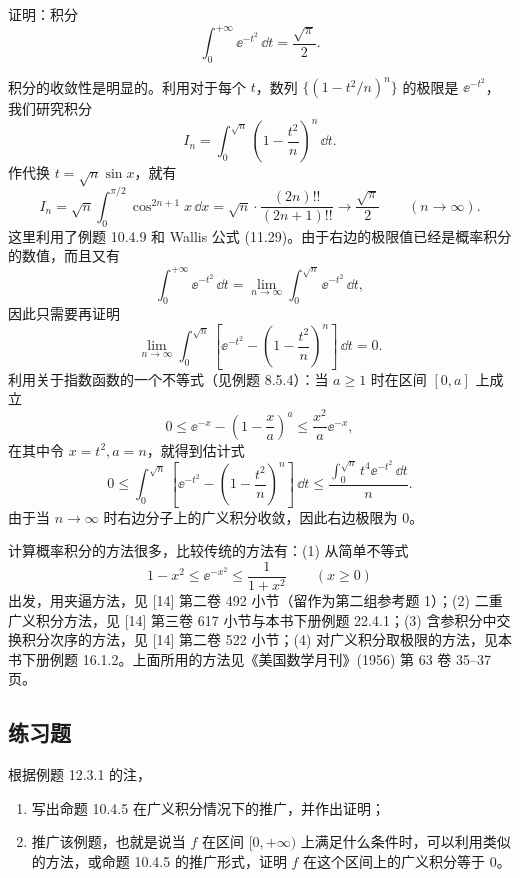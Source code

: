\begin{xexample}
证明：积分
\[
  \int_0^{+\infty}\ee^{-t^2}\,\dd t=\frac{\sqrt\pi}{2}.
\]
\end{xexample}
\begin{xsolution}
积分的收敛性是明显的。利用对于每个 $t$，数列 $\{(1-t^2/n)^n\}$ 的极限是 $\ee^{-t^2}$，我们研究积分
\[
  I_n=\int_0^{\sqrt n}\left(1-\frac{t^2}n\right)^n\,\dd t.
\]
作代换 $t=\sqrt n\sin x$，就有
\[
  I_n=\sqrt n\int_0^{\pi/2}\cos^{2n+1}x\,\dd x
  =\sqrt n\cdot\frac{(2n)!!}{(2n+1)!!}\to\frac{\sqrt\pi}{2}\qquad(n\to\infty).
\]
这里利用了例题 10.4.9 和 Wallis 公式 (11.29)。由于右边的极限值已经是概率积分的数值，而且又有
\[
  \int_0^{+\infty}\ee^{-t^2}\,\dd t
  =\lim_{n\to\infty}\int_0^{\sqrt n}\ee^{-t^2}\,\dd t,
\]
因此只需要再证明
\[
  \lim_{n\to\infty}\int_0^{\sqrt n}\left[\ee^{-t^2}-\left(1-\frac{t^2}n\right)^n\right]\,\dd t=0.
\]
利用关于指数函数的一个不等式（见例题 8.5.4）：当 $a\geq1$ 时在区间 $[0,a]$ 上成立
\begin{equation}
  0\leq\ee^{-x}-\left(1-\frac xa\right)^a\leq\frac{x^2}{a}\ee^{-x},
  \tag{12.7}
  \label{eq:12.7}
\end{equation}
在其中令 $x=t^2,a=n$，就得到估计式
\[
  0\leq\int_0^{\sqrt n}\left[\ee^{-t^2}-\left(1-\frac{t^2}n\right)^n\right]\,\dd t
  \leq\frac{\int_0^{\sqrt n}t^4\ee^{-t^2}\,\dd t}{n}.
\]
由于当 $n\to\infty$ 时右边分子上的广义积分收敛，因此右边极限为 0。
\end{xsolution}

\begin{xremark}
计算概率积分的方法很多，比较传统的方法有：(1) 从简单不等式
\begin{equation}
  1-x^2\leq\ee^{-x^2}\leq\frac1{1+x^2}\qquad(x\geq0)
  \tag{12.8}
  \label{eq:12.8}
\end{equation}
出发，用夹逼方法，见 [14] 第二卷 492 小节（留作为第二组参考题 1）；(2) 二重广义积分方法，见 [14] 第三卷 617 小节与本书下册例题 22.4.1；(3) 含参积分中交换积分次序的方法，见 [14] 第二卷 522 小节；(4) 对广义积分取极限的方法，见本书下册例题 16.1.2。上面所用的方法见《美国数学月刊》(1956) 第 63 卷 35--37 页。
\end{xremark}

\subsection{练习题}

\begin{xexercise}[1]
根据例题 12.3.1 的注，
  \begin{enumerate}[label=(\arabic*)]
    \item 写出命题 10.4.5 在广义积分情况下的推广，并作出证明；
    \item 推广该例题，也就是说当 $f$ 在区间 $[0,+\infty)$ 上满足什么条件时，可以利用类似的方法，或命题 10.4.5 的推广形式，证明 $f$ 在这个区间上的广义积分等于 0。
  \end{enumerate}
\end{xexercise}

